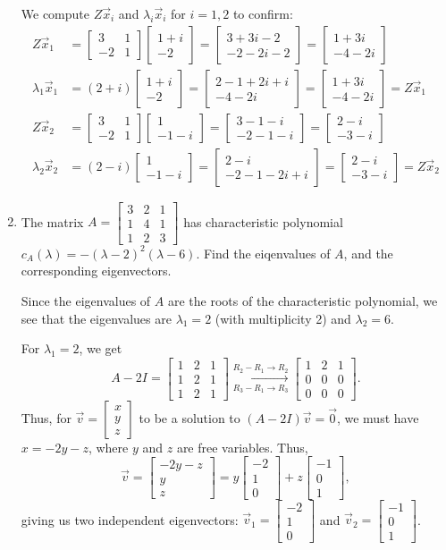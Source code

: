 \documentclass[12pt]{article}
\newcommand{\bbm}{\begin{bmatrix}}
\newcommand{\ebm}{\end{bmatrix}}
\begin{document}
\begin{enumerate}
We compute $Z\vec{x}_i$ and $\lambda_i\vec{x}_i$ for $i=1,2$ to confirm:
\begin{align*}
Z\vec{x}_1 & = \bbm 3&1\\-2&1\ebm\bbm 1+i\\-2\ebm = \bbm 3+3i-2\\-2-2i-2\ebm = \bbm 1+3i\\-4-2i\ebm\\
\lambda_1\vec{x}_1 &= (2+i)\bbm 1+i\\-2\ebm = \bbm 2-1+2i+i\\-4-2i\ebm = \bbm 1+3i\\-4-2i\ebm=Z\vec{x}_1\\
Z\vec{x}_2 & = \bbm 3&1\\-2&1\ebm\bbm 1\\-1-i\ebm = \bbm 3-1-i\\-2-1-i\ebm = \bbm 2-i\\-3-i\ebm\\
\lambda_2\vec{x}_2 &= (2-i)\bbm 1\\-1-i\ebm = \bbm 2-i\\-2-1-2i+i\ebm = \bbm 2-i\\-3-i\ebm = Z\vec{x}_2
\end{align*}
\newpage

\item The matrix $A = \bbm 3&2&1\\1&4&1\\1&2&3\ebm$ has characteristic polynomial $c_A(\lambda)=-(\lambda-2)^2(\lambda-6)$. Find the eiqenvalues of $A$, and the corresponding eigenvectors.

\bigskip

Since the eigenvalues of $A$ are the roots of the characteristic polynomial, we see that the eigenvalues are $\lambda_1=2$  (with multiplicity 2) and $\lambda_2=6$.

For $\lambda_1=2$, we get
\[
A-2I = \bbm 1&2&1\\1&2&1\\1&2&1\ebm \xrightarrow[R_3-R_1\to R_3]{R_2-R_1\to R_2} \bbm 1&2&1\\0&0&0\\0&0&0\ebm.
\]
Thus, for $\vec{v}=\bbm x\\y\\z\ebm$ to be a solution to $(A-2I)\vec{v}=\vec{0}$, we must have $x=-2y-z$, where $y$ and $z$ are free variables. Thus,
\[
\vec{v}=\bbm -2y-z\\y\\z\ebm = y\bbm -2\\1\\0\ebm + z\bbm -1\\0\\1\ebm,
\]
giving us two independent eigenvectors: $\vec{v}_1 = \bbm -2\\1\\0\ebm$ and $\vec{v}_2 = \bbm -1\\0\\1\ebm$.


\end{enumerate}
\end{document}
